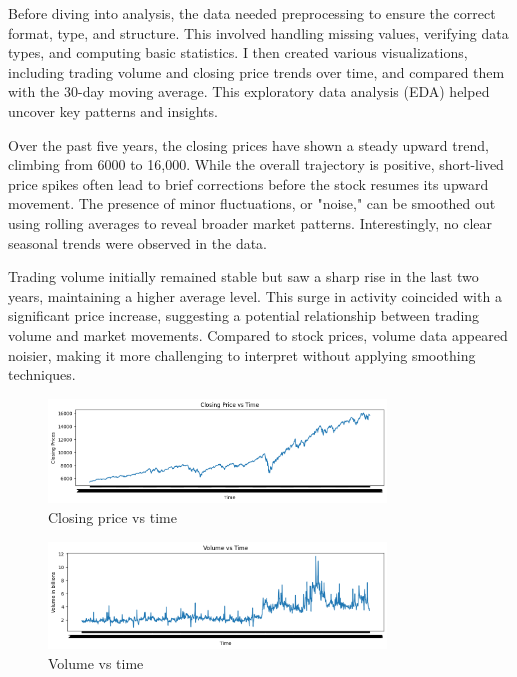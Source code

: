 \documentclass[12pt,a4paper]{article}
\begin{document}
Before diving into analysis, the data needed preprocessing to ensure the correct format, type, and structure. This involved handling missing values, verifying data types, and computing basic statistics. I then created various visualizations, including trading volume and closing price trends over time, and compared them with the 30-day moving average. This exploratory data analysis (EDA) helped uncover key patterns and insights.

Over the past five years, the closing prices have shown a steady upward trend, climbing from 6000 to 16,000. While the overall trajectory is positive, short-lived price spikes often lead to brief corrections before the stock resumes its upward movement. The presence of minor fluctuations, or "noise," can be smoothed out using rolling averages to reveal broader market patterns. Interestingly, no clear seasonal trends were observed in the data.

Trading volume initially remained stable but saw a sharp rise in the last two years, maintaining a higher average level. This surge in activity coincided with a significant price increase, suggesting a potential relationship between trading volume and market movements. Compared to stock prices, volume data appeared noisier, making it more challenging to interpret without applying smoothing techniques.

\begin{figure}[!h]
    \centering
    \includegraphics[width=0.8\textwidth]{Week0_closing_price.png} %
    \caption{Closing price vs time}
    \label{fig1}
\end{figure}

\begin{figure}[!h]
    \centering
    \includegraphics[width=0.8\textwidth]{Week0_volume.png} %
    \caption{Volume vs time}
    \label{fig2}
\end{figure}
\end{document}
